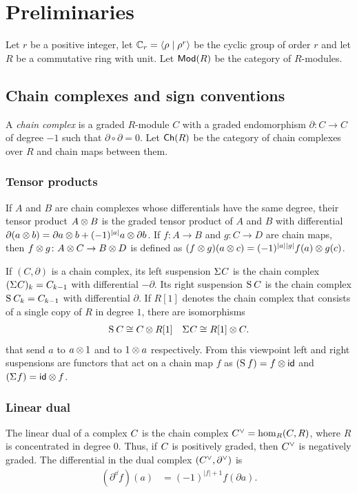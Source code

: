 
\section{Preliminaries}\label{s:preliminaries}

Let $r$ be a positive integer, let $\mathbb{C}_r = \langle \rho\mid \rho^r\rangle$ be the cyclic group of order $r$ and let $R$ be a commutative ring with unit. Let $\mathsf{Mod}(R)$ be the category of $R$-modules.




\subsection{Chain complexes and sign conventions}

A \emph{chain complex} is a graded $R$-module $C$ with a graded endomorphism $\partial \colon C\to C$ of degree $-1$ such that $\partial\circ \partial =0$. Let $\mathsf{Ch}(R)$ be the category of chain complexes over $R$ and chain maps between them.


\subsubsection{Tensor products}	If $A$ and $B$ are chain complexes whose differentials have the same degree, their tensor product $A \otimes B$ is the graded tensor product of $A$ and $B$ with differential $\partial(a \otimes b) = \partial a \otimes b + (-1)^{|a|}a \otimes \partial b$. If $f\colon A\to B$ and $g\colon C\to D$ are chain maps, then $f\otimes g\colon A\otimes C\to B\otimes D$ is defined as $(f\otimes g)(a\otimes c) = (-1)^{|a||g|}f(a)\otimes g(c)$.

If $(C,\partial)$ is a chain complex, its left suspension $\Sigma^{}C$ is the chain complex $(\Sigma^{}C)_k = C_{k-1}$ with differential $-\partial$. Its right suspension $\operatorname{S}^{}C$ is the chain complex $\operatorname{S}^{}C_k = C_{k-1}$ with differential $\partial$. If $R[1]$ denotes the chain complex that consists of a single copy of $R$ in degree $1$, there are isomorphisms 
\begin{align}\label{eq:401}
	\operatorname{S}^{} C_{} &\cong C_{} \otimes R[1] & \Sigma^{} C_{} \cong R[1] \otimes C_{}.
\end{align}
that send $a$ to $a \otimes 1$ and to $1 \otimes a$ respectively. From this viewpoint left and right suspensions are functors that act on a chain map $f$ as $(\operatorname{S}^{}f) = f\otimes \mathsf{id}$ and $(\Sigma^{} f) = \mathsf{id}\otimes f$.


\subsubsection{Linear dual} The linear dual of a complex $C_{}$ is the chain complex $C^\vee_{} = \hom_R(C_{},R)$, where $R$ is concentrated in degree $0$. Thus, if $C_{}$ is positively graded, then $C^\vee_{}$ is negatively graded. The differential in the dual complex $(C^\vee_{},\partial^\vee)$ is
\begin{align*}
	(\partial^\dd f)(a) &= (-1)^{|f|+1} f(\partial a). 
\end{align*} 

